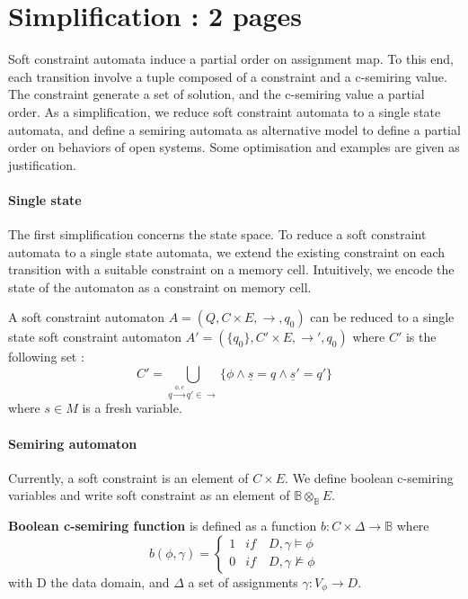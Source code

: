 \section{Simplification : 2 pages}
Soft constraint automata induce a partial order on assignment map. To this end, each transition involve a tuple composed of a constraint and a c-semiring value. The constraint generate a set of solution, and the c-semiring value a partial order. As a simplification, we reduce soft constraint automata to a single state automata, and define a semiring automata as alternative model to define a partial order on behaviors of open systems. Some optimisation and examples are given as justification.

\paragraph{Single state} The first simplification concerns the state space. To reduce a soft constraint automata to a single state automata, we extend the existing constraint on each transition with a suitable constraint on a memory cell. Intuitively, we encode the state of the automaton as a constraint on memory cell.

\begin{theorem}
	A soft constraint automaton $A =(Q,C\times E, \rightarrow, q_0)$ can be reduced to a single state soft constraint automaton $A' = (\{q_0\}, C'\times E, \rightarrow', q_0)$ where $C'$ is the following set :
		$$C' = \bigcup\limits_{q\xrightarrow{\phi,e}q' \in \rightarrow} \{\phi \land \underline{s}=q \land \underline{s}'=q'\}$$
		where $s \in M$ is a fresh variable.
\end{theorem}

\paragraph{Semiring automaton} 
Currently, a soft constraint is an element of $C \times E$. We define boolean c-semiring variables and write soft constraint as an element of $\mathbb{B} \otimes_{\mathbb{B}} E$.

\begin{definition} \textbf{Boolean c-semiring function} is defined as a function $b : C \times \Delta \rightarrow \mathbb{B}$ where $$b(\phi,\gamma) = \begin{cases}
	1 &if \quad D,\gamma \models \phi  \\ 
	0 &if \quad D,\gamma \not\models \phi 
\end{cases}$$
	with D the data domain, and $\Delta$ a set of assignments $\gamma : V_{\phi} \rightarrow D$.
\end{definition}

